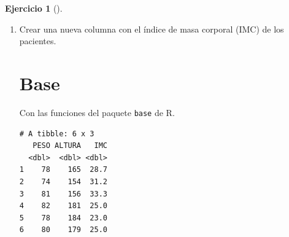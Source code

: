 \documentclass[
  spanish,
  a4paper,
]{scrreport}
\newenvironment{Shaded}{\begin{snugshade}}{\end{snugshade}}
\newcommand{\DecValTok}[1]{\textcolor[rgb]{0.68,0.00,0.00}{#1}}
\newcommand{\FunctionTok}[1]{\textcolor[rgb]{0.28,0.35,0.67}{#1}}
\newcommand{\NormalTok}[1]{\textcolor[rgb]{0.00,0.23,0.31}{#1}}
\newcommand{\OtherTok}[1]{\textcolor[rgb]{0.00,0.23,0.31}{#1}}
\newcommand{\SpecialCharTok}[1]{\textcolor[rgb]{0.37,0.37,0.37}{#1}}
\newcommand{\StringTok}[1]{\textcolor[rgb]{0.13,0.47,0.30}{#1}}
\theoremstyle{definition}
\newtheorem{exercise}{Ejercicio}[chapter]
\theoremstyle{remark}
\begin{document}
\begin{exercise}[]
\begin{enumerate}
\begin{tcolorbox}
\begin{verbatim}
# A tibble: 6 x 3
  F_NACIM             F_INCLUS              AGE
  <dttm>              <dttm>              <dbl>
1 1941-09-08 00:00:00 1998-07-13 00:00:00  56.8
2 1957-07-10 00:00:00 1998-05-09 00:00:00  40.8
3 1967-08-18 00:00:00 2000-04-01 00:00:00  32.6
4 1956-05-08 00:00:00 1998-11-13 00:00:00  42.5
5 1958-11-02 00:00:00 1999-02-24 00:00:00  40.3
6 1953-06-13 00:00:00 2000-03-16 00:00:00  46.8
\end{verbatim}

  \end{tcolorbox}
\item
  Crear una nueva columna con el índice de masa corporal (IMC) de los
  pacientes.

  \begin{tcolorbox}[enhanced jigsaw, titlerule=0mm, arc=.35mm, rightrule=.15mm, opacitybacktitle=0.6, leftrule=.75mm, colframe=quarto-callout-tip-color-frame, toptitle=1mm, breakable, colbacktitle=quarto-callout-tip-color!10!white, bottomrule=.15mm, colback=white, left=2mm, bottomtitle=1mm, opacityback=0, title=\textcolor{quarto-callout-tip-color}{\faLightbulb}\hspace{0.5em}{Solución}, toprule=.15mm, coltitle=black]

  \section{Base}

  Con las funciones del paquete \texttt{base} de R.

\begin{Shaded}
\end{Shaded}

\begin{verbatim}
# A tibble: 6 x 3
   PESO ALTURA   IMC
  <dbl>  <dbl> <dbl>
1    78    165  28.7
2    74    154  31.2
3    81    156  33.3
4    82    181  25.0
5    78    184  23.0
6    80    179  25.0
\end{verbatim}


\end{tcolorbox}
\end{enumerate}
\end{exercise}
\end{document}
